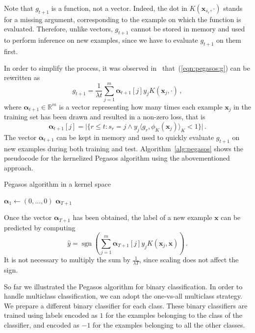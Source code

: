 \documentclass[runningheads]{llncs}
\DeclareMathOperator{\sgn}{sgn}
\begin{document}
Note that $g_{t+1}$ is a function, not a vector. Indeed, the dot in $K(\bm{x}_{s_r}, \cdot)$ stands for a missing argument, corresponding to the example on which the function is evaluated. Therefore, unlike vectors, $g_{t+1}$ cannot be stored in memory and used to perform inference on new examples, since we have to evaluate $g_{t+1}$ on them first.

In order to simplify the process, it was observed in~\cite{shalev-pegasos-2011} that~(\ref{eqn:pegasos:g}) can be rewritten as
\[
  g_{t+1} = \frac{1}{\lambda t} \sum_{j = 1}^{m} \bm{\alpha}_{t+1}[j] y_j K(\bm{x}_j, \cdot) \, ,
\]
where $\bm{\alpha}_{t+1} \in \mathbb{R}^m$ is a vector representing how many times each example $\bm{x}_j$ in the training set has been drawn and resulted in a non-zero loss, that is
\[
  \bm{\alpha}_{t+1}[j] = 	\lvert \{r \leq t : s_r = j \land y_j\langle g_r, \phi_K(\bm{x}_j) \rangle_K < 1 \} \rvert \, .
\]
The vector $\bm{\alpha}_{t+1}$ can be kept in memory and used to quickly evaluate $g_{t+1}$ on new examples during both training and test. Algorithm~\ref{alg:pegasos} shows the pseudocode for the kernelized Pegasos algorithm using the abovementioned approach.    

\begin{algorithm}
  \DontPrintSemicolon
  \caption{Pegasos algorithm in a kernel space}\label{alg:pegasos}
  $\bm{\alpha}_1 \gets (0,\dots,0)$\;
  \Return $\bm{\alpha}_{T+1}$
\end{algorithm}

Once the vector $\bm{\alpha}_{T+1}$ has been obtained, the label of a new example $\bm{x}$ can be predicted by computing
\begin{equation}
  \hat{y} = \sgn \left( \sum_{j = 1}^{m} \bm{\alpha}_{T+1}[j] y_j K(\bm{x}_j, \bm{x}) \right) \, .
\end{equation}
It is not necessary to multiply the sum by $\frac{1}{\lambda T}$, since scaling does not affect the sign.

So far we illustrated the Pegasos algorithm for binary classification. In order to handle multiclass classification, we can adopt the one-vs-all multiclass strategy. We prepare a different binary classifier for each class. These binary classifiers are trained using labels encoded as $1$ for the examples belonging to the class of the classifier, and encoded as $-1$ for the examples belonging to all the other classes. 
\end{document}
